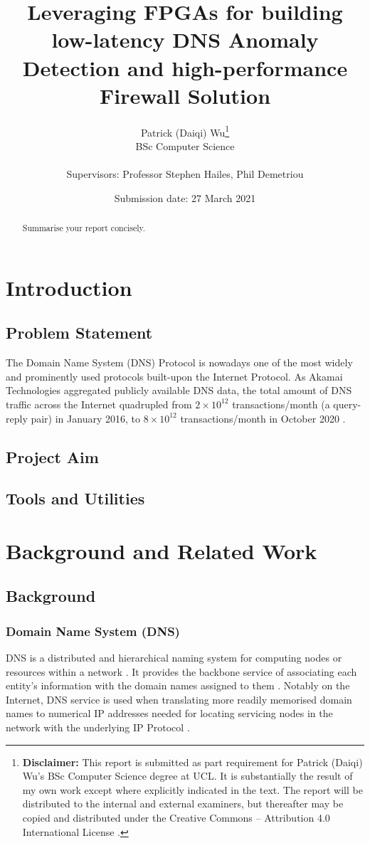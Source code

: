 \documentclass[a4paper]{report}
\title{{\vspace{-14em}}
{{\Huge Leveraging FPGAs for building low-latency DNS Anomaly Detection and high-performance Firewall Solution}} \\
{\large}}
\date{Submission date: 27 March 2021}
\author{Patrick (Daiqi) Wu\thanks{
{\bf Disclaimer:}
This report is submitted as part requirement for Patrick (Daiqi) Wu's BSc Computer Science degree at UCL. It is
substantially the result of my own work except where explicitly indicated in the text.
The report will be distributed to the internal and external examiners, but thereafter may be copied and distributed under the Creative Commons -- Attribution 4.0 International License \cite{cc-by-4.0}.}
\\
BSc Computer Science\\ \\
Supervisors: Professor Stephen Hailes, Phil Demetriou}
\begin{document}
 
\onehalfspacing
\maketitle
\begin{abstract}
Summarise your report concisely.
\end{abstract}
\tableofcontents
\setcounter{page}{1}

\chapter{Introduction}

\section{Problem Statement}
The Domain Name System (DNS) Protocol is nowadays one of the most widely and prominently used protocols built-upon the Internet Protocol. As Akamai Technologies aggregated publicly available DNS data, the total amount of DNS traffic across the Internet quadrupled from $ 2 \times 10^{12}$ transactions/month (a query-reply pair) in January 2016, to $8 \times 10^{12}$ transactions/month in October 2020 \cite{DNS-Trends-and-Traffic}.


\section{Project Aim}

\section{Tools and Utilities}

\chapter{Background and Related Work}

\section{Background}

\subsection{Domain Name System (DNS)}
DNS is a distributed and hierarchical naming system for computing nodes or resources within a network \cite{RFC-1034}. It provides the backbone service of associating each entity's information with the domain names assigned to them \cite{RFC-1034, RFC-1035}. Notably on the Internet, DNS service is used when translating more readily memorised domain names to numerical IP addresses needed for locating servicing nodes in the network with the underlying IP Protocol \cite{RFC-1034, RFC-791}.
\end{document}
